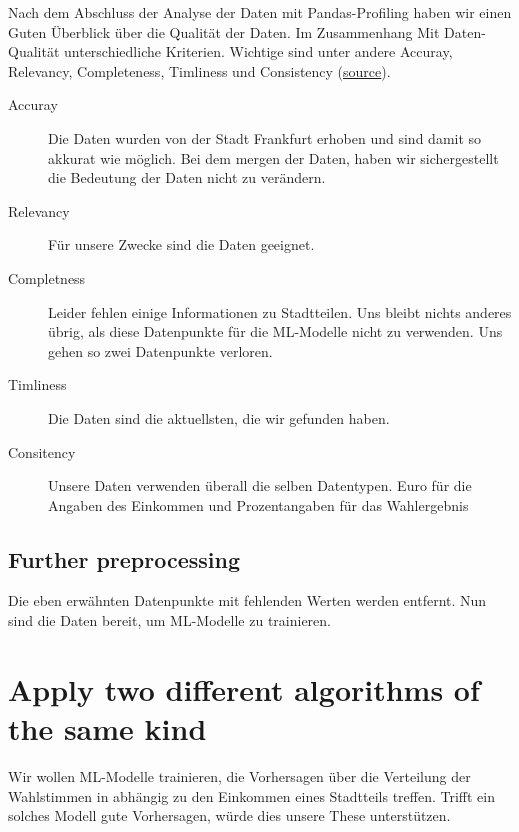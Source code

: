 \documentclass[a4paper,10pt]{scrartcl}
\begin{document}
Nach dem Abschluss der Analyse der Daten mit Pandas-Profiling haben wir einen Guten Überblick über die Qualität der Daten. Im Zusammenhang Mit Daten-Qualität unterschiedliche Kriterien. Wichtige sind unter andere Accuray, Relevancy, Completeness, Timliness und Consistency (\href{https://towardsdatascience.com/7-steps-to-ensure-and-sustain-data-quality-3c0040591366}{source}).
\begin{description}
\item[Accuray] Die Daten wurden von der Stadt Frankfurt erhoben und sind damit so akkurat wie möglich. Bei dem mergen der Daten, haben wir sichergestellt die Bedeutung der Daten nicht zu verändern.
\item[Relevancy] Für unsere Zwecke sind die Daten geeignet.
\item[Completness] Leider fehlen einige Informationen zu Stadtteilen. Uns bleibt nichts anderes übrig, als diese Datenpunkte für die ML-Modelle nicht zu verwenden. Uns gehen so zwei Datenpunkte verloren.
\item[Timliness] Die Daten sind die aktuellsten, die wir gefunden haben.
\item[Consitency] Unsere Daten verwenden überall die selben Datentypen. Euro für die Angaben des Einkommen und Prozentangaben für das Wahlergebnis
\end{description}


\subsection{Further preprocessing}
Die eben erwähnten Datenpunkte mit fehlenden Werten werden entfernt. Nun sind die Daten bereit, um ML-Modelle zu trainieren.


\section{Apply two different algorithms of the same kind}
Wir wollen ML-Modelle trainieren, die Vorhersagen über die Verteilung der Wahlstimmen in abhängig zu den Einkommen eines Stadtteils treffen. Trifft ein solches Modell gute Vorhersagen, würde dies unsere These unterstützen.
\end{document}
